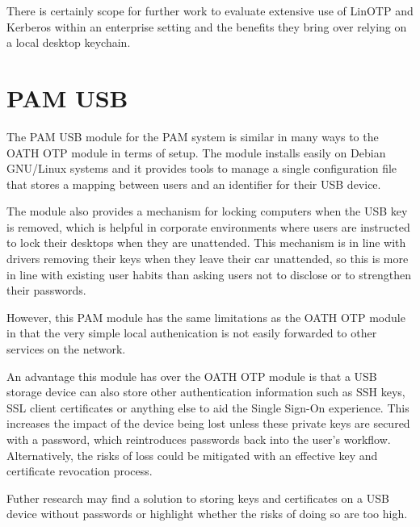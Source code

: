 \documentclass{report}
\begin{document}
There is certainly scope for further work to evaluate extensive
use of LinOTP and Kerberos within an enterprise setting and the
benefits they bring over relying on a local desktop keychain.

\section{PAM USB}

The PAM USB module for the PAM system is similar in many
ways to the OATH OTP module in terms of setup. The module
installs easily on Debian GNU/Linux systems and it provides
tools to manage a single configuration file that stores a
mapping between users and an identifier for their USB device.

The module also provides a mechanism for locking computers
when the USB key is removed, which is helpful in corporate
environments where users are instructed to lock their desktops
when they are unattended. This mechanism is in line with
drivers removing their keys when they leave their car
unattended, so this is more in line with existing user
habits than asking users not to disclose or to strengthen
their passwords.

However, this PAM module has the same limitations as the
OATH OTP module in that the very simple local authenication
is not easily forwarded to other services on the network.


An advantage this module has over the OATH OTP module is that
a USB storage device can also store other authentication
information such as SSH keys, SSL client certificates or
anything else to aid the Single Sign-On experience. This
increases the impact of the device being lost unless
these private keys are secured with a password, which
reintroduces passwords back into the user's workflow. Alternatively,
the risks of loss could be mitigated with an effective
key and certificate revocation process.

Futher research may find a solution to storing keys
and certificates on a USB device without passwords or highlight
whether the risks of doing so are too high.
\end{document}
